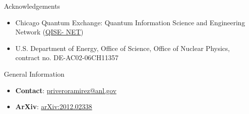 \documentclass[final]{beamer}
\newlength{\onecolwid}
\begin{document}
\begin{frame}[t]
\begin{columns}[t]
\begin{column}{\onecolwid}

%
%



\begin{block}{Acknowledgements}

  \begin{small}
  \begin{itemize}
    \item Chicago Quantum Exchange: Quantum Information Science and Engineering Network (\href{https://qisenet.uchicago.edu/overview/}{QISE- NET})
    \item U.S. Department of Energy, Office of Science, Office of Nuclear Physics, contract no. DE-AC02-06CH11357
  \end{itemize}
  \end{small}

\end{block}



\begin{alertblock}{General Information}

  \begin{itemize}
    \item \textbf{Contact}: \href{mailto:priveroramirez@anl.gov}{priveroramirez@anl.gov}
    \item \textbf{ArXiv}: \href{https://arxiv.org/abs/2012.02338}{arXiv:2012.02338}
  \end{itemize}

\end{alertblock}


\end{column} %
\end{columns} %
\end{frame} %

\end{document}
